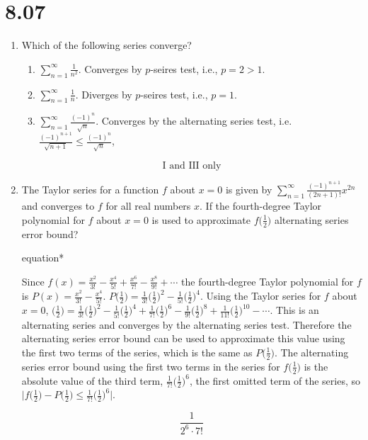 \documentclass[12pt]{article}
\begin{document}
\section*{8.07}
\begin{enumerate}
	\item Which of the following series converge?
	      \begin{enumerate}[label=\Roman*.]
	      	\item $\sum_{n=1}^{\infty} \frac{1}{n^2}$. Converges by $p$-seires test, i.e., $p = 2 > 1$.
	      	\item $\sum_{n=1}^{\infty} \frac{1}{n}$. Diverges by $p$-seires test, i.e., $ p = 1$.
	      	\item $\sum_{n=1}^{\infty} \frac{(-1)^n}{\sqrt{n}}$. Converges by the alternating series test, i.e. $\frac{(-1)^{n+1}}{\sqrt{n+1}} \leq \frac{(-1)^{n}}{\sqrt{n}}$, 
	      \end{enumerate}
		  $$\boxed{\text{I and III only}}$$
	\item The Taylor series for a function $f$ about $x = 0$ is given by $\sum_{n=1}^{\infty} \frac{(-1)^{n+1}}{(2n+1)!}x^{2n}$ and converges to $f$ for all real numbers $x$. If the fourth-degree Taylor polynomial for $f$ about $x = 0$ is used to approximate $f\big(\frac{1}{2}\big)$ alternating series error bound?
	\begin{empheq}[box=\tcbhighmath]{equation*}
		\parbox{6in}{Since $f(x)=\frac{x^2}{3!} - \frac{x^4}{5!} +  \frac{x^6}{7!} - \frac{x^8}{9!} + \cdots$ the fourth-degree Taylor polynomial for $f$ is $P(x)= \frac{x^2}{3!} - \frac{x^4}{5!}$. $P\big(\frac{1}{2}\big)=\frac{1}{3!}\big(\frac{1}{2})^2 - \frac{1}{5!}\big(\frac{1}{2})^4$. Using the Taylor series for $f$ about $x = 0$, $\big(\frac{1}{2}\big) = \frac{1}{3!}\big(\frac{1}{2})^2 - \frac{1}{5!}\big(\frac{1}{2})^4 + \frac{1}{7!}\big(\frac{1}{2})^6 - \frac{1}{9!}\big(\frac{1}{2})^8 + \frac{1}{11!}\big(\frac{1}{2})^{10} - \cdots$. This is an alternating series and converges by the alternating series test. Therefore the alternating series error bound can be used to approximate this value using the first two terms of the series, which is the same as $P\big(\frac{1}{2}\big)$. The alternating series error bound using the first two terms in the series for $f\big(\frac{1}{2}\big)$ is the absolute value of the third term, $\frac{1}{7!}\big(\frac{1}{2})^6$, the first omitted term of the series, so $\bigg|f\big(\frac{1}{2}\big) - P\big(\frac{1}{2}\big) \leq \frac{1}{7!}\big(\frac{1}{2}\big)^6\bigg|$.}
	\end{empheq}
	$$\boxed{\frac{1}{2^6 \cdot 7!}}$$

\end{enumerate}
\end{document}
